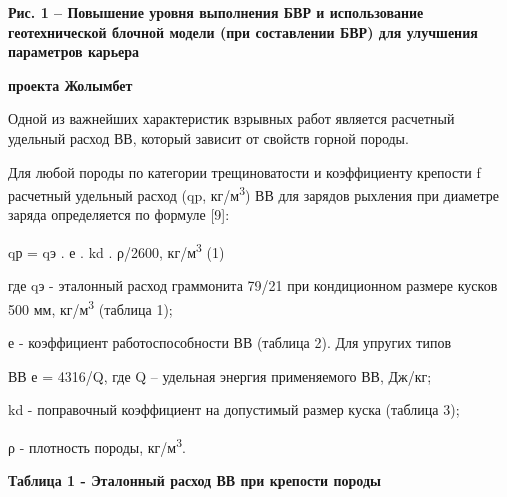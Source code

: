 {\bfseries Рис. 1 -- Повышение уровня выполнения БВР и использование
геотехнической блочной модели (при составлении БВР) для улучшения
параметров карьера}

{\bfseries проекта Жолымбет}

Одной из важнейших характеристик взрывных работ является расчетный
удельный расход ВВ, который зависит от свойств горной породы.

Для любой породы по категории трещиноватости и коэффициенту крепости f
расчетный удельный расход (qp, кг/м\textsuperscript{3}) ВВ для зарядов
рыхления при диаметре заряда определяется по формуле {[}9{]}:

qр = qэ . е . kd . ρ/2600, кг/м\textsuperscript{3} (1)

где qэ - эталонный расход граммонита 79/21 при кондиционном размере
кусков 500 мм, кг/м\textsuperscript{3} (таблица 1);

е - коэффициент работоспособности ВВ (таблица 2). Для упругих типов

ВВ е = 4316/Q, где Q -- удельная энергия применяемого ВВ, Дж/кг;

kd - поправочный коэффициент на допустимый размер куска (таблица 3);

ρ - плотность породы, кг/м\textsuperscript{3}.

{\bfseries Таблица 1 - Эталонный расход ВВ при крепости породы}

% 
% 
% 
% 
% 
% 
% 
% 
% 
% 
% 
% 
% 
% 
% 
% 

